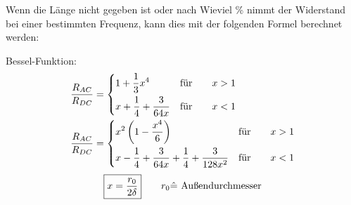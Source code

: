 Wenn die Länge nicht gegeben ist oder nach Wieviel \% nimmt der Widerstand bei
einer bestimmten Frequenz, kann dies mit der folgenden Formel berechnet werden:

\begin{description}
    \item Bessel-Funktion:
          \begin{align*}
              \frac{R_{AC}}{R_{DC}} & =
              \begin{dcases}
                  1 + \frac{1}{3}x^4              & \text{für} \qquad x > 1 \\
                  x + \frac{1}{4} + \frac{3}{64x} & \text{für} \qquad x < 1 \\
              \end{dcases} \\
              \frac{R_{AC}}{R_{DC}} & =
              \begin{dcases}
                  x^2\left( 1-\frac{x^4}{6} \right)                               & \text{für} \qquad x > 1 \\
                  x- \frac{1}{4} + \frac{3}{64x} + \frac{1}{4} + \frac{3}{128x^2} & \text{für} \qquad x < 1 \\
              \end{dcases}
          \end{align*}
          \[
              \boxed{x=\frac{r_0}{2\delta}} \qquad r_0 \hat{=} \textnormal{ Außendurchmesser}
          \]
\end{description}
\newpage
